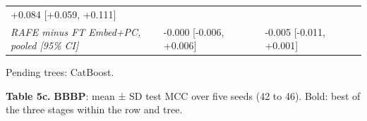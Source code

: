 \documentclass[
  10pt,
]{article}
\begin{document}
\begin{longtable}[]{@{}lllllll@{}}
\begin{minipage}[t]{0.12\columnwidth}
+0.084 {[}+0.059, +0.111{]}\strut
\end{minipage} & \begin{minipage}[t]{0.12\columnwidth}\raggedright
\strut
\end{minipage} & \begin{minipage}[t]{0.12\columnwidth}\raggedright
\strut
\end{minipage}\tabularnewline
\begin{minipage}[t]{0.12\columnwidth}\raggedright
\emph{RAFE minus FT Embed+PC, pooled {[}95\% CI{]}}\strut
\end{minipage} & \begin{minipage}[t]{0.12\columnwidth}\raggedright
-0.000 {[}-0.006, +0.006{]}\strut
\end{minipage} & \begin{minipage}[t]{0.12\columnwidth}\raggedright
\strut
\end{minipage} & \begin{minipage}[t]{0.12\columnwidth}\raggedright
\strut
\end{minipage} & \begin{minipage}[t]{0.12\columnwidth}\raggedright
-0.005 {[}-0.011, +0.001{]}\strut
\end{minipage} & \begin{minipage}[t]{0.12\columnwidth}\raggedright
\strut
\end{minipage} & \begin{minipage}[t]{0.12\columnwidth}\raggedright
\strut
\end{minipage}\tabularnewline
\bottomrule
\end{longtable}

Pending trees: CatBoost.

\textbf{Table 5c.} \textbf{BBBP}: mean ± SD test MCC over five seeds (42
to 46). Bold: best of the three stages within the row and tree.
\end{document}
